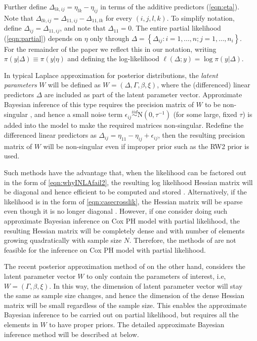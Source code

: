 \documentclass[ba]{imsart}
\begin{document}
Further define $\Delta_{lk,ij} = \eta_{lk} - \eta_{ij}$ in terms of the additive predictors (\ref{eqn:eta}). Note that $\Delta_{lk,ij} = \Delta_{11,ij} - \Delta_{11,lk}$ for every $(i,j,l,k)$. To simplify notation, define $\Delta_{ij} = \Delta_{11,ij}$, and note that $\Delta_{11} = 0$. The entire partial likelihood (\ref{eqn:partial}) depends on $\eta$ only through  $\Delta = \left\{\Delta_{ij}: i = 1,\ldots,n; j = 1,\ldots,n_{i} \right\}$. For the remainder of the paper we reflect this in our notation, writing $\pi(y|\Delta) \equiv \pi(y|\eta)$ and defining the log-likelihood $\ell(\Delta; y) = \log\pi(y|\Delta)$.

In typical Laplace approximation for posterior distributions, the \textit{latent parameters} $W$ will be defined as $W = \left(\Delta, \Gamma,\beta, \xi \right)$, where the (differenced) linear predictors $\Delta$ are included as part of the latent parameter vector. Approximate Bayesian inference of this type requires the precision matrix of $W$ to be non-singular \citep{inla,inlacoxph,casecross}, and hence a small noise term $\epsilon_{ij} \stackrel{iid}{\sim} \text{N}(0,\tau^{-1})$ (for some large, fixed $\tau$) is added into the model to make the required matrices non-singular. Redefine the differenced linear predictors as $\Delta_{ij} = \eta_{11} - \eta_{ij} + \epsilon_{ij}$, then the resulting precision matrix of $W$ will be non-singular even if improper prior such as the RW2 prior is used.

Such methods have the advantage that, when the likelihood can be factored out in the form of \ref{eqn:whyINLAfail2}, the resulting log likelihood Hessian matrix will be diagonal and hence efficient to be computed and stored \citep{inla}. Alternatively, if the likelihood is in the form of \ref{eqn:casecrosslik}, the Hessian matrix will be sparse even though it is no longer diagonal \citep{casecross}. However, if one consider doing such approximate Bayesian inference on Cox PH model with partial likelihood, the resulting Hessian matrix will be completely dense and with number of elements growing quadratically with sample size $N$. Therefore, the methods of \cite{inla,inlacoxph,casecross} are not feasible for the inference on Cox PH model with partial likelihood. 

The recent posterior approximation method of \cite{ELGM} on the other hand, considers the latent parameter vector $W$ to only contain the parameters of interest, i.e, $W = \left(\Gamma,\beta, \xi \right)$. In this way, the dimension of latent parameter vector will stay the same as sample size changes, and hence the dimension of the dense Hessian matrix will be small regardless of the sample size. This enables the approximate Bayesian inference to be carried out on partial likelihood, but requires all the elements in $W$ to have proper priors. The detailed approximate Bayesian inference method will be described at below.
\end{document}
